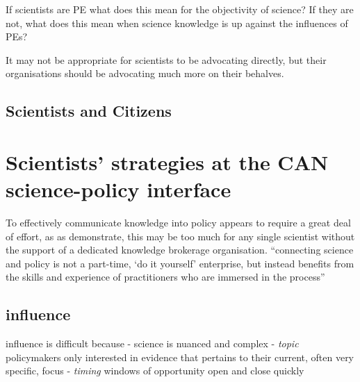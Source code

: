  

If scientists are PE what does this mean for the objectivity of science?
If they are not, what does this mean when science knowledge is up against the influences of PEs?


It may not be appropriate for scientists to be advocating directly, but their organisations should be advocating much more on their behalves.


\subsection{Scientists and Citizens}



\section{Scientists' strategies at the CAN science-policy interface}\label{sec:disstrat}

To effectively communicate knowledge into policy appears to require a great deal of effort, as as \textcite{BednarekSHG2015} demonstrate, this may be too much for any single scientist without the support of a dedicated knowledge brokerage organisation. ``connecting science and policy is not a part-time, `do it yourself' enterprise, but instead benefits from the skills and experience of practitioners who are immersed in the process''



\subsection{influence}
influence is difficult because
- \emph{} science is nuanced and complex
- \emph{topic} policymakers only interested in evidence that pertains to their current, often very specific, focus
- \emph{timing} windows of opportunity open and close quickly

